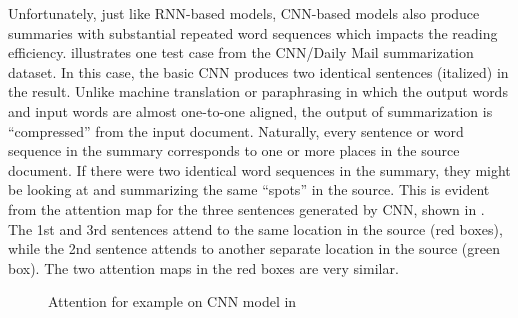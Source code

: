 Unfortunately, just like RNN-based models, CNN-based models also produce
summaries with substantial repeated word sequences which impacts the reading efficiency.
 illustrates one 
test case from the CNN/Daily Mail summarization dataset. 
In this case, the basic CNN produces two 
identical sentences (italized) in the result. 
Unlike machine translation or paraphrasing in which the output words
and input words are almost one-to-one aligned, the output of summarization
is ``compressed'' from the input document. Naturally, every sentence or 
word sequence in the summary corresponds to one or more places in the source
document. If there were two identical word sequences in the summary,
they might be looking at and summarizing the same ``spots'' in the source.
This is evident from the attention map for the three sentences generated by 
CNN, shown in . The 1st and 3rd sentences attend to
the same location in the source (red boxes), 
while the 2nd sentence attends to another separate location in the source (green box). 
The two attention maps in the red boxes are very similar.

\begin{figure}[th!]
\centering
{}
\quad
{}
\quad
{}
\caption{Attention for example on CNN model in }
\label{fig:attn_map}
\end{figure}

